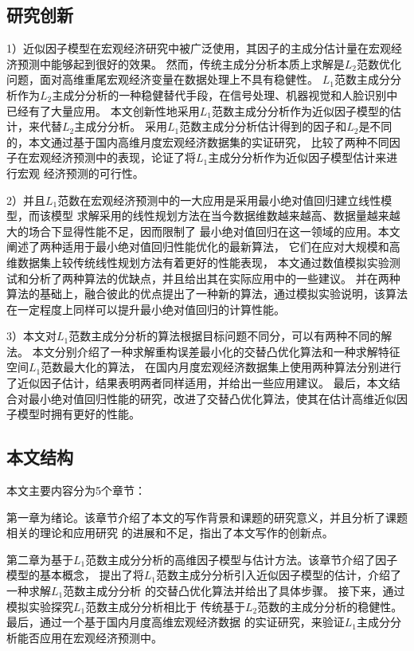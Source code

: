\subsection{研究创新}

1）近似因子模型在宏观经济研究中被广泛使用，其因子的主成分估计量在宏观经济预测中能够起到很好的效果。
然而，传统主成分分析本质上求解是$L_2$范数优化问题，面对高维重尾宏观经济变量在数据处理上不具有稳健性。
$L_1$范数主成分分析作为$L_2$主成分分析的一种稳健替代手段，在信号处理、机器视觉和人脸识别中
已经有了大量应用。
本文创新性地采用$L_1$范数主成分分析作为近似因子模型的估计，来代替$L_2$主成分分析。
采用$L_1$范数主成分分析估计得到的因子和$L_2$是不同的，本文通过基于国内高维月度宏观经济数据集的实证研究，
比较了两种不同因子在宏观经济预测中的表现，论证了将$L_1$主成分分析作为近似因子模型估计来进行宏观
经济预测的可行性。

2）并且$L_1$范数在宏观经济预测中的一大应用是采用最小绝对值回归建立线性模型，而该模型
求解采用的线性规划方法在当今数据维数越来越高、数据量越来越大的场合下显得性能不足，因而限制了
最小绝对值回归在这一领域的应用。本文阐述了两种适用于最小绝对值回归性能优化的最新算法，
它们在应对大规模和高维数据集上较传统线性规划方法有着更好的性能表现，
本文通过数值模拟实验测试和分析了两种算法的优缺点，并且给出其在实际应用中的一些建议。
并在两种算法的基础上，融合彼此的优点提出了一种新的算法，通过模拟实验说明，该算法
在一定程度上同样可以提升最小绝对值回归的计算性能。

3）本文对$L_1$范数主成分分析的算法根据目标问题不同分，可以有两种不同的解法。
本文分别介绍了一种求解重构误差最小化的交替凸优化算法和一种求解特征空间$L_1$范数最大化的算法，
在国内月度宏观经济数据集上使用两种算法分别进行了近似因子估计，结果表明两者同样适用，并给出一些应用建议。
最后，本文结合对最小绝对值回归性能的研究，改进了交替凸优化算法，使其在估计高维近似因子模型时拥有更好的性能。

\subsection{本文结构}

本文主要内容分为5个章节：

第一章为绪论。该章节介绍了本文的写作背景和课题的研究意义，并且分析了课题相关的理论和应用研究
的进展和不足，指出了本文写作的创新点。

第二章为基于$L_1$范数主成分分析的高维因子模型与估计方法。该章节介绍了因子模型的基本概念，
提出了将$L_1$范数主成分分析引入近似因子模型的估计，介绍了一种求解$L_1$范数主成分分析
的交替凸优化算法并给出了具体步骤。
接下来，通过模拟实验探究$L_1$范数主成分分析相比于
传统基于$L_2$范数的主成分分析的稳健性。
最后，通过一个基于国内月度高维宏观经济数据
的实证研究，来验证$L_1$主成分分析能否应用在宏观经济预测中。

